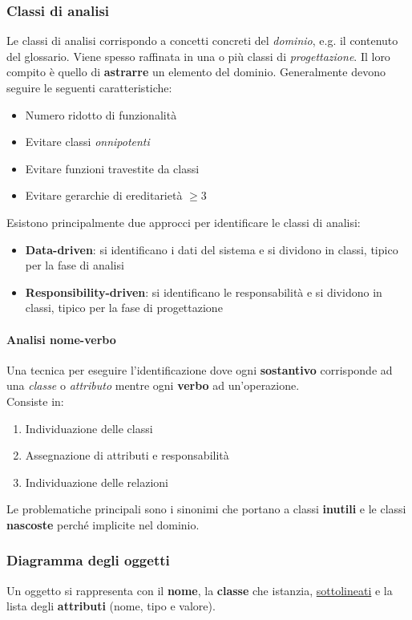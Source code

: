\subsubsection{Classi di analisi}
Le classi di analisi corrispondo a concetti concreti del \textit{dominio}, e.g. il contenuto del glossario. Viene spesso raffinata in una o più classi di \textit{progettazione}. Il loro compito è quello di \textbf{astrarre} un elemento del dominio. Generalmente devono seguire le seguenti caratteristiche:
\begin{itemize}
	\item Numero ridotto di funzionalità
	\item Evitare classi \textit{onnipotenti}
	\item Evitare funzioni travestite da classi
	\item Evitare gerarchie di ereditarietà $\geq 3$
\end{itemize}
Esistono principalmente due approcci per identificare le classi di analisi:
\begin{itemize}
	\item \textbf{Data-driven}: si identificano i dati del sistema e si dividono in classi, tipico per la fase di analisi
	\item \textbf{Responsibility-driven}: si identificano le responsabilità e si dividono in classi, tipico per la fase di progettazione
\end{itemize}
\paragraph{Analisi nome-verbo}
Una tecnica per eseguire l'identificazione dove ogni \textbf{sostantivo} corrisponde ad una \textit{classe} o \textit{attributo} mentre ogni \textbf{verbo} ad un'operazione.\\
Consiste in:
\begin{enumerate}
	\item Individuazione delle classi
	\item Assegnazione di attributi e responsabilità
	\item Individuazione delle relazioni
\end{enumerate}
Le problematiche principali sono i sinonimi che portano a classi \textbf{inutili} e le classi \textbf{nascoste} perché implicite nel dominio.

\subsubsection{Diagramma degli oggetti}
Un oggetto si rappresenta con il \textbf{nome}, la \textbf{classe} che istanzia, \underline{sottolineati} e la lista degli \textbf{attributi} (nome, tipo e valore).
